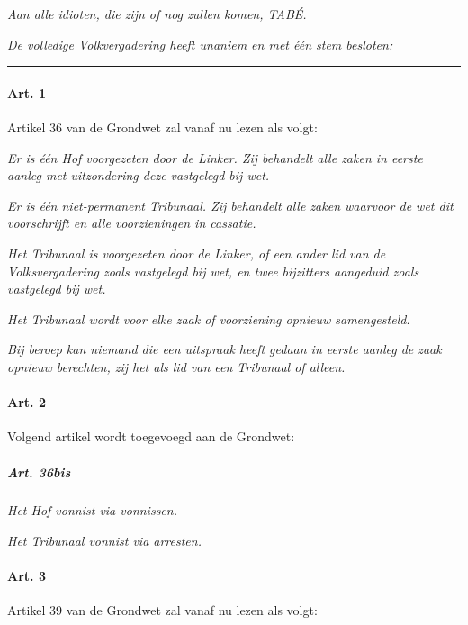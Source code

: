 \emph{Aan alle idioten, die zijn of nog zullen komen, TABÉ.}

\emph{De volledige Volkvergadering heeft unaniem en met één stem
besloten:}

\begin{center}\rule{0.5\linewidth}{0.5pt}\end{center}

\hypertarget{art.-1}{%
\paragraph{Art. 1}\label{art.-1}}

Artikel 36 van de Grondwet zal vanaf nu lezen als volgt:

\emph{Er is één Hof voorgezeten door de Linker. Zij behandelt alle zaken
in eerste aanleg met uitzondering deze vastgelegd bij wet.}

\emph{Er is één niet-permanent Tribunaal. Zij behandelt alle zaken
waarvoor de wet dit voorschrijft en alle voorzieningen in cassatie.}

\emph{Het Tribunaal is voorgezeten door de Linker, of een ander lid van
de Volksvergadering zoals vastgelegd bij wet, en twee bijzitters
aangeduid zoals vastgelegd bij wet.}

\emph{Het Tribunaal wordt voor elke zaak of voorziening opnieuw
samengesteld.}

\emph{Bij beroep kan niemand die een uitspraak heeft gedaan in eerste
aanleg de zaak opnieuw berechten, zij het als lid van een Tribunaal of
alleen.}

\hypertarget{art.-2}{%
\paragraph{Art. 2}\label{art.-2}}

Volgend artikel wordt toegevoegd aan de Grondwet:

\hypertarget{art.-36bis}{%
\subparagraph{\texorpdfstring{\emph{Art.
36bis}}{Art. 36bis}}\label{art.-36bis}}

\emph{Het Hof vonnist via vonnissen.}

\emph{Het Tribunaal vonnist via arresten.}

\hypertarget{art.-3}{%
\paragraph{Art. 3}\label{art.-3}}

Artikel 39 van de Grondwet zal vanaf nu lezen als volgt:

